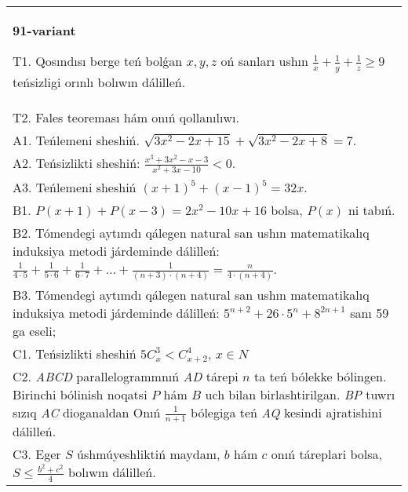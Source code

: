 \documentclass{article}
\begin{document}
\begin{tabular}{m{17cm}}
\textbf{91-variant}
\newline

T1. Qosındısı berge teń bolǵan \(x,y,z\) oń sanları ushın \(\frac{1}{x} + \frac{1}{y} + \frac{1}{z} \geq 9\) teńsizligi orınlı bolıwın dálilleń. \\
T2. Fales teoreması hám onıń qollanılıwı. \\
A1. Teńlemeni sheshiń. \(\sqrt{3x^{2} - 2x + 15} + \sqrt{3x^{2} - 2x + 8} = 7\). \\
A2. Teńsizlikti sheshiń: \(\frac{x^{3} + 3x^{2} - x - 3}{x^{2} + 3x - 10} < 0\). \\
A3. Teńlemeni sheshiń \((x + 1)^{5} + (x - 1)^{5} = 32x\). \\
B1. \(P(x + 1) + P(x - 3) = 2x^{2} - 10x + 16\) bolsa, \(P(x)\) ni tabıń. \\
B2. Tómendegi aytımdı qálegen natural san ushın matematikalıq induksiya metodi járdeminde dálilleń: \(\frac{1}{4 \cdot 5} + \frac{1}{5 \cdot 6} + \frac{1}{6 \cdot 7} + \ldots + \frac{1}{(n + 3) \cdot (n + 4)} = \frac{n}{4 \cdot (n + 4)}\). \\
B3. Tómendegi aytımdı qálegen natural san ushın matematikalıq induksiya metodi járdeminde dálilleń: \(5^{n + 2} + 26 \cdot 5^{n} + 8^{2n + 1}\) sanı 59 ga eseli; \\
C1. Teńsizlikti sheshiń \(5C_{x}^{3} < C_{x + 2}^{4}\), \(x \in N\) \\
C2. \emph{ABCD} parallelogrammnıń \emph{AD} tárepi \(n\) ta teń bólekke bólingen. Birinchi bólinish noqatsi \(P\) hám \(B\) uch bilan birlashtirilgan. \emph{BP} tuwrı sızıq \emph{AC} dioganaldan Onıń \(\frac{1}{n + 1}\) bólegiga teń \emph{AQ} kesindi ajratishini dálilleń. \\
C3. Eger \(S\) úshmúyeshliktiń maydanı, \(b\) hám \(c\) onıń táreplari bolsa, \(S \leq \frac{b^{2} + c^{2}}{4}\) bolıwın dálilleń. \\

\end{tabular}
\vspace{1cm}
\end{document}
